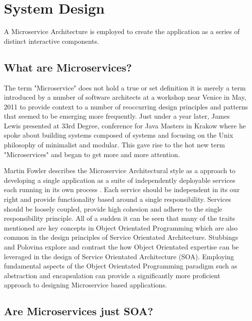 \chapter{System Design}

A Microservice Architecture is employed to create the application as a series of distinct interactive components.

\section{What are Microservices?}
The term "Microservice" does not hold a true or set definition it is merely a term introduced by a number of software architects at a workshop near Venice in May, 2011 to provide context to a number of reoccurring design principles and patterns that seemed to be emerging more frequently.
	Just under a year later, James Lewis presented at 33rd Degree, conference for Java Masters in Krakow where he spoke about building systems composed of systems and focusing on the Unix philosophy of minimalist and modular. \cite{JamesLewis33rdDegree} 
This gave rise to the hot new term "Microservices" and began to get more and more attention. 

Martin Fowler describes the Microservice Architectural style as a approach to developing a single application as a suite of independently deployable services each running in its own process \cite{MicroservicesResourceGuide}. Each service should be independent in its our right and provide functionality based around a single responsibility. Services should be loosely coupled, provide high cohesion and adhere to the single responsibility principle. All of a sudden it can be seen that many of the traits mentioned are key concepts in Object Orientated Programming which are also common in the design principles of Service Orientated Architecture. Stubbings and Polovina \cite{StubbingsPolovina} explore and contrast the how Object Orientated expertise can be leveraged in the design of Service Orientated Architecture (SOA). Employing fundamental aspects of the Object Orientated Programming paradigm such as abstraction and encapsulation can provide a significantly more proficient approach to designing Microservice based applications.

\section{Are Microservices just SOA?}

